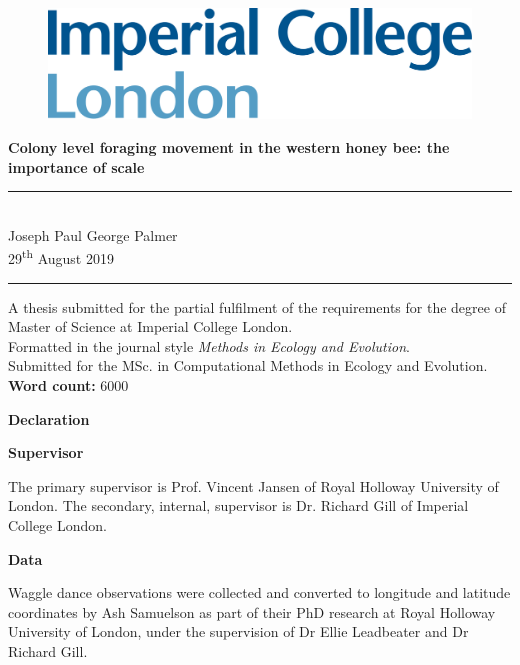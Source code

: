 \documentclass[11pt,usenames,dvipsnames,a4paper]{article}
\begin{document}
\begin{titlepage}

\begin{figure}[H]
	\includegraphics[scale=0.13]{../Poster/Images/ICL_Logo.png}
\end{figure}
\vfill
\begin{center}
\noindent
\huge{
\textbf{Colony level foraging movement in the western honey bee: the importance of scale}
}\\[1.5cm]
\noindent\rule{\textwidth}{0.05pt}\\[0.2cm]
\noindent
\Large{
	Joseph Paul George Palmer\\
	29\textsuperscript{th} August 2019
}\\

\noindent\rule{\textwidth}{0.05pt}
\vfill\vfill\vfill
\large{A thesis submitted for the partial fulfilment of the requirements for the degree of Master of Science at Imperial College London.\\[0.5cm]
	Formatted in the journal style \textit{Methods in Ecology and Evolution}.\\
	Submitted for the MSc. in Computational Methods in Ecology and Evolution.\\[1.5cm]
	\textbf{Word count:} 6000
}\\
\vfill\vfill
\end{center}

\end{titlepage}

\newpage

\begin{center}
	\Large{\textbf{Declaration}}
\end{center}
\noindent
\Large{\textbf{Supervisor}}

\noindent
The primary supervisor is Prof. Vincent Jansen of Royal Holloway University of London. The secondary, internal, supervisor is Dr. Richard Gill of Imperial College London.

\noindent
\Large{\textbf{Data}}

\noindent
Waggle dance observations were collected and converted to longitude and latitude coordinates by Ash Samuelson as part of their PhD research at Royal Holloway University of London, under the supervision of Dr Ellie Leadbeater and Dr Richard Gill.
\end{document}

